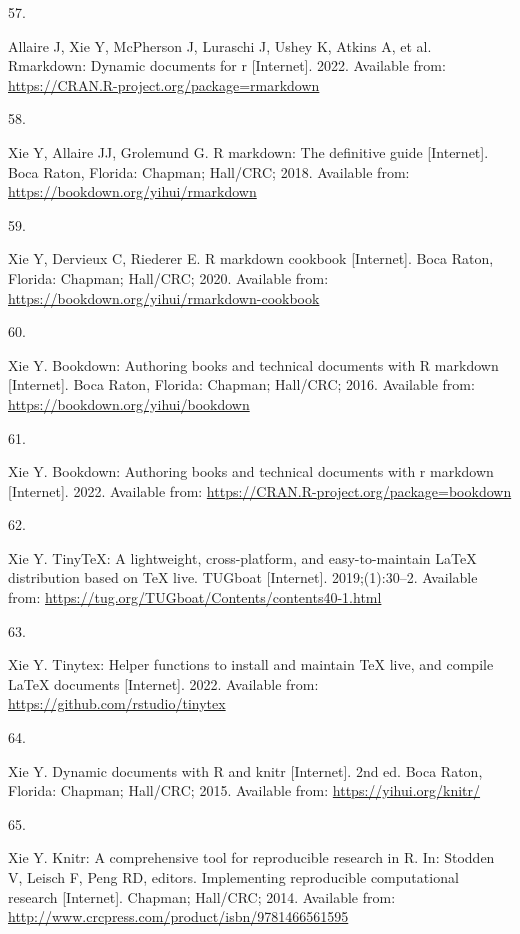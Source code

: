 \documentclass[10pt,a4paper]{article}
\newlength{\cslhangindent}
\newlength{\csllabelwidth}
\newlength{\cslentryspacingunit} %
\newenvironment{CSLReferences}[2] %
 {%
  \setlength{\parindent}{0pt}
  \ifodd #1
  \let\oldpar\par
  \def\par{\hangindent=\cslhangindent\oldpar}
  \fi
  \setlength{\parskip}{#2\cslentryspacingunit}
 }%
 {}
\newcommand{\CSLLeftMargin}[1]{\parbox[t]{\csllabelwidth}{#1}}
\newcommand{\CSLRightInline}[1]{\parbox[t]{\linewidth - \csllabelwidth}{#1}\break}
\begin{document}
\begin{CSLReferences}{0}{0}
\leavevmode\hypertarget{ref-R-rmarkdown}{}%
\CSLLeftMargin{57. }
\CSLRightInline{Allaire J, Xie Y, McPherson J, Luraschi J, Ushey K, Atkins A, et al. Rmarkdown: Dynamic documents for r {[}Internet{]}. 2022. Available from: \url{https://CRAN.R-project.org/package=rmarkdown}}

\leavevmode\hypertarget{ref-rmarkdown2018}{}%
\CSLLeftMargin{58. }
\CSLRightInline{Xie Y, Allaire JJ, Grolemund G. R markdown: The definitive guide {[}Internet{]}. Boca Raton, Florida: Chapman; Hall/CRC; 2018. Available from: \url{https://bookdown.org/yihui/rmarkdown}}

\leavevmode\hypertarget{ref-rmarkdown2020}{}%
\CSLLeftMargin{59. }
\CSLRightInline{Xie Y, Dervieux C, Riederer E. R markdown cookbook {[}Internet{]}. Boca Raton, Florida: Chapman; Hall/CRC; 2020. Available from: \url{https://bookdown.org/yihui/rmarkdown-cookbook}}

\leavevmode\hypertarget{ref-bookdown2016}{}%
\CSLLeftMargin{60. }
\CSLRightInline{Xie Y. Bookdown: Authoring books and technical documents with {R} markdown {[}Internet{]}. Boca Raton, Florida: Chapman; Hall/CRC; 2016. Available from: \url{https://bookdown.org/yihui/bookdown}}

\leavevmode\hypertarget{ref-R-bookdown}{}%
\CSLLeftMargin{61. }
\CSLRightInline{Xie Y. Bookdown: Authoring books and technical documents with r markdown {[}Internet{]}. 2022. Available from: \url{https://CRAN.R-project.org/package=bookdown}}

\leavevmode\hypertarget{ref-tinytex2019}{}%
\CSLLeftMargin{62. }
\CSLRightInline{Xie Y. TinyTeX: A lightweight, cross-platform, and easy-to-maintain LaTeX distribution based on TeX live. TUGboat {[}Internet{]}. 2019;(1):30--2. Available from: \url{https://tug.org/TUGboat/Contents/contents40-1.html}}

\leavevmode\hypertarget{ref-R-tinytex}{}%
\CSLLeftMargin{63. }
\CSLRightInline{Xie Y. Tinytex: Helper functions to install and maintain TeX live, and compile LaTeX documents {[}Internet{]}. 2022. Available from: \url{https://github.com/rstudio/tinytex}}

\leavevmode\hypertarget{ref-knitr2015}{}%
\CSLLeftMargin{64. }
\CSLRightInline{Xie Y. Dynamic documents with {R} and knitr {[}Internet{]}. 2nd ed. Boca Raton, Florida: Chapman; Hall/CRC; 2015. Available from: \url{https://yihui.org/knitr/}}

\leavevmode\hypertarget{ref-knitr2014}{}%
\CSLLeftMargin{65. }
\CSLRightInline{Xie Y. Knitr: A comprehensive tool for reproducible research in {R}. In: Stodden V, Leisch F, Peng RD, editors. Implementing reproducible computational research {[}Internet{]}. Chapman; Hall/CRC; 2014. Available from: \url{http://www.crcpress.com/product/isbn/9781466561595}}


\end{CSLReferences}
\end{document}

